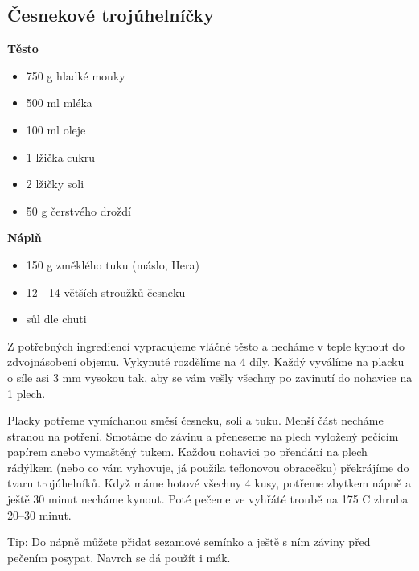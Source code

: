 \documentclass[10pt,a4paper]{article}
\newenvironment{myitemize}
{ \begin{itemize}
    \setlength{\itemsep}{0pt}
    \setlength{\parskip}{0pt}
    \setlength{\parsep}{0pt}     }
{ \end{itemize}                  }
\begin{document}
\subsection{Česnekové trojúhelníčky}
\begin{minipage}[t]{0,5\textwidth}
\textbf{Těsto}
\begin{myitemize} 
\item 750 g hladké mouky
\item 500 ml mléka
\item 100 ml oleje
\item 1 lžička cukru
\item 2 lžičky soli
\item 50 g čerstvého droždí
\end{myitemize}
\textbf{Náplň}
\begin{myitemize} 
\item 150 g změklého tuku (máslo, Hera)
\item 12 - 14 větších stroužků česneku
\item sůl dle chuti
\end{myitemize}
\end{minipage}
\begin{minipage}[t]{0,5\textwidth}
Z potřebných ingrediencí vypracujeme vláčné těsto a necháme v teple kynout do zdvojnásobení objemu. Vykynuté rozdělíme na 4 díly. Každý vyválíme na placku o síle asi 3 mm vysokou tak, aby se vám vešly všechny po zavinutí do nohavice na 1 plech.

Placky potřeme vymíchanou směsí česneku, soli a tuku. Menší část necháme stranou na potření. Smotáme do závinu a přeneseme na plech vyložený pečícím papírem anebo vymaštěný tukem. Každou nohavici po přendání na plech rádýlkem (nebo co vám vyhovuje, já použila teflonovou obracečku) překrájíme do tvaru trojúhelníků. Když máme hotové všechny 4 kusy, potřeme zbytkem nápně a ještě 30 minut necháme kynout. Poté pečeme ve vyhřáté troubě na 175 \degree C zhruba 20–30 minut.

Tip: Do nápně můžete přidat sezamové semínko a ještě s ním záviny před pečením posypat. Navrch se dá použít i mák.
\end{minipage}
\end{document}
